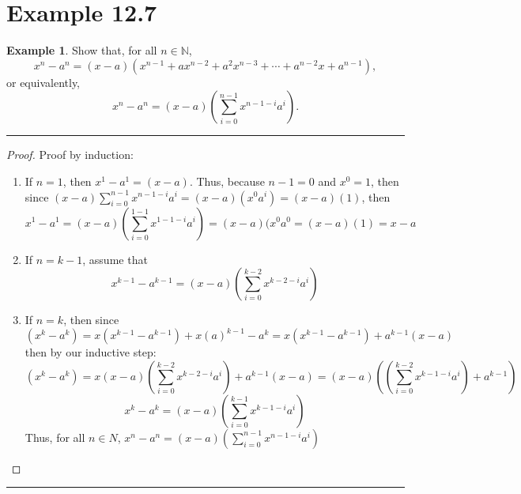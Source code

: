 \documentclass[openany, amssymb, psamsfonts]{amsart}
\newcommand{\bbN}{\mathbb{N}}
\theoremstyle{definition}
\newtheorem{exmp}{Example}[section]
\numberwithin{equation}{section}
\begin{document}
\section*{Example 12.7}
\begin{exmp}\label{12.7}
	Show that, for all $n\in\bbN$, 
	\[
		x^n - a^n = (x - a)(x^{n-1} + a x^{n-2} + a^2 x^{n-3} + \dotsb + a^{n-2} x + a^{n-1}),
	\]
	or equivalently,
	\[
		x^n - a^n = (x-a)\left(\sum_{i=0}^{n-1} x^{n-1-i} a^i\right).
	\]
\end{exmp}
\vspace{4pt}     \hrule   \vspace{4pt} \begin{proof}
Proof by induction:
\begin{enumerate}
    \item If $n= 1$, then $x^1- a^1 = (x-a)$. Thus, because $n-1 = 0$ and $x^0 = 1$, then since $(x-a)\sum_{i=0}^{n-1}x^{n-1-i}a^i = (x-a)(x^{0}a^i) = (x-a)(1)$, then \[x^1-a^1 = (x-a)\left(\sum_{i=0}^{1-1}x^{1-1-i}a^i\right) = (x-a)(x^0a^0= (x-a)(1) = x-a\]
    \item If $n=k-1$, assume that \[x^{k-1}-a^{k-1} = (x-a)\left(\sum_{i=0}^{k-2} x^{k-2-i} a^i\right)\]
    \item If $n=k$, then since \[(x^{k} - a^{k}) = x(x^{k-1} - a^{k-1}) +x(a)^{k-1} - a^k =x(x^{k-1} - a^{k-1})  + a^{k-1}(x-a)\] then by our inductive step:\[(x^{k} - a^{k}) = x(x-a)\left(\sum_{i=0}^{k-2} x^{k-2-i} a^i\right) + a^{k-1}(x-a) = (x-a)(\left(\sum_{i=0}^{k-2} x^{k-1-i} a^i\right) + a^{k-1})\] \[x^k - a^k = (x-a)\left(\sum_{i=0}^{k-1} x^{k-1-i} a^i\right)\]
Thus, for all $n\in N$, $x^n - a^n = (x-a)\left(\sum_{i=0}^{n-1} x^{n-1-i} a^i\right)$
\end{enumerate}
\end{proof} \vspace{4pt}     \hrule   \vspace{4pt}
\end{document}
